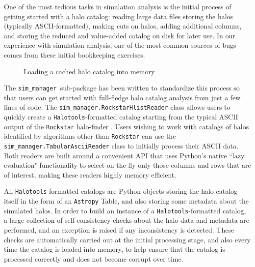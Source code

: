 \documentclass[twocolumn, tighten]{aastex6}
\newcommand{\sims}{{\tt sim\_manager }}
\begin{document}
One of the most tedious tasks in simulation analysis is the initial process of getting started with a halo catalog: reading large data files storing the halos (typically ASCII-formatted), making cuts on halos, adding additional columns, and storing the reduced and value-added catalog on disk for later use. In our experience with simulation analysis, one of the most common sources of bugs comes from these initial bookkeeping exercises.

\begin{figure}
\center
\caption{Loading a cached halo catalog into memory\label{code:cachedsim}}
\vspace{0.1in}
\end{figure}

The \sims sub-package has been written to standardize this process so that users can get started with full-fledge halo catalog analysis from just a few lines of code. The {\tt sim\_manager.RockstarHlistReader} class allows users to quickly create a {\tt Halotools}-formatted catalog starting from the typical ASCII output of the {\tt Rockstar} halo-finder \citep{behroozi_rockstar11, rockstar_trees}. Users wishing to work with catalogs of halos identified by algorithms other than {\tt Rockstar} can use the {\tt sim\_manager.TabularAsciiReader} class to initially process their ASCII data. Both readers are built around a convenient API that uses Python's native ``lazy evaluation" functionality to select on-the-fly only those columns and rows that are of interest, making these readers highly memory efficient.

All {\tt Halotools}-formatted catalogs are Python objects storing the halo catalog itself in the form of an {\tt Astropy} Table, and also storing some metadata about the simulated halos. In order to build an instance of a {\tt Halotools}-formatted catalog, a large collection of self-consistency checks about the halo data and metadata are performed, and an exception is raised if any inconsistency is detected. These checks are automatically carried out at the initial processing stage, and also every time the catalog is loaded into memory, to help ensure that the catalog is processed correctly and does not become corrupt over time.
\end{document}
